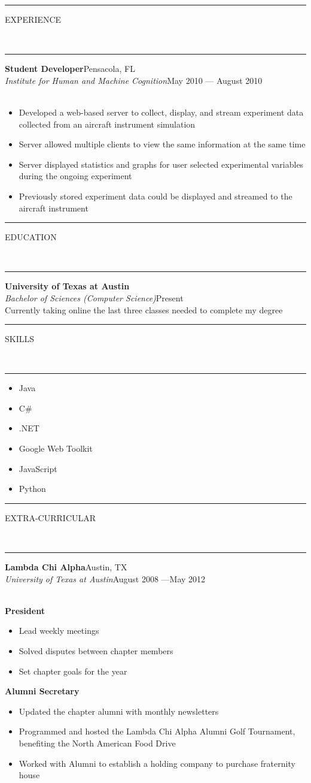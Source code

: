 \documentclass[10pt, letterpaper, oneside]{article}
\newcommand{\HRule}[2]{\textcolor{#1}{\rule{\linewidth}{#2}}}
\newcommand{\sectiontitle}[1]{\begin{minipage}{\textwidth}\HRule{black}{0.25mm}\vspace{-10pt}\begin{center}\Large\MakeUppercase{#1}\end{center}\end{minipage}\\\HRule{light-grey}{0.15mm}\vspace{\baselineskip}}
\newenvironment{ressection}[1]{
  \sectiontitle{#1}}
  {\vspace{-\baselineskip}}
\newenvironment{tightressection}[1]{
  \begin{minipage}{\textwidth}
  \sectiontitle{#1}}
  {\vspace{\baselineskip}\end{minipage}}
\newenvironment{rescolumn}{
  \begin{minipage}{0.5\textwidth}
    \begin{itemize}[noitemsep,nolistsep]}
  {\end{itemize}
    \end{minipage}}
\newcommand{\resitem}[1]{
    \vspace{2pt}
    \item \begin{flushleft} #1 \end{flushleft}
}
\newcommand{\resitemcenter}[1]{
    \vspace{2pt}
    \item \begin{center} #1 \end{center}
}
\newcommand{\resedentry}[4]{
  \begin{minipage}{\textwidth}
  \vspace{-10pt}
  \textbf{#1}\\
  \textit{#2}\hfill\textcolor{light-grey}{#3}\\
  #4
  \vspace{0.5\baselineskip}
  \end{minipage}
}
\newcommand{\resentryheader}[5]{
    \vspace{-5pt}
    \textbf{#1}\hspace{\stretch{1}}\textcolor{light-grey}{#3}\\
    \textit{#2}\hspace{\stretch{1}}\textcolor{light-grey}{#4}\\
    \if\relax\detokenize{#5}\relax
    \else
      #5\\
    \fi
    \vspace{2pt}
}
\newenvironment{resentry}[5]{
  \begin{minipage}{\textwidth}
    \resentryheader{#1}{#2}{#3}{#4}{#5}
        \vspace{-\baselineskip}
    \begin{itemize}[noitemsep,nolistsep]
}{
    \end{itemize}
        \vspace{\baselineskip}
        \end{minipage}
}
\newenvironment{ressubentry}[1]{
  \begin{minipage}{\textwidth}
    \resitem{\textbf{#1}}
    \begin{itemize}[noitemsep,nolistsep]
}{
    \end{itemize}
        \end{minipage}
}
\begin{document}
\begin{ressection}{experience}
  \begin{resentry}{Student Developer}{Institute for Human and Machine Cognition}{Pensacola, FL}{May 2010 --- August 2010}{}
    \resitem{Developed a web-based server to collect, display, and stream experiment data collected from an aircraft instrument simulation}
    \resitem{Server allowed multiple clients to view the same information at the same time}
    \resitem{Server displayed statistics and graphs for user selected experimental variables during the ongoing experiment}
    \resitem{Previously stored experiment data could be displayed and streamed to the aircraft instrument}
  \end{resentry}
 \vspace{5pt}
\end{ressection}
 


\begin{tightressection}{education}
  \resedentry{University of Texas at Austin}{Bachelor of Sciences (Computer Science)}{Present}{Currently taking online the last three classes needed to complete my degree}
  \vspace{-10pt}
\end{tightressection}

\begin{tightressection}{skills}
  \begin{rescolumn}
      \resitemcenter{Java}
      \resitemcenter{C\#}
      \resitemcenter{.NET}
    \end{rescolumn}
  \begin{rescolumn}
      \resitemcenter{Google Web Toolkit}
      \resitemcenter{JavaScript}
      \resitemcenter{Python}
    \end{rescolumn}
\end{tightressection}

\begin{tightressection}{Extra-Curricular}
 \begin{resentry}{Lambda Chi Alpha}{University of Texas at Austin}{Austin, TX}{August 2008 ---May 2012}{}
    \begin{ressubentry}{President}
      \resitem{Lead weekly meetings}
      \resitem{Solved disputes between chapter members}
      \resitem{Set chapter goals for the year}
    \end{ressubentry}
    \begin{ressubentry}{Alumni Secretary}
      \resitem{Updated the chapter alumni with monthly newsletters}
      \resitem{Programmed and hosted the Lambda Chi Alpha Alumni Golf Tournament, benefiting the North American Food Drive}
      \resitem{Worked with Alumni to establish a holding company to purchase fraternity house}
      \end{ressubentry}
  \end{resentry} 
  \vspace{-20pt}
\end{tightressection}
     
\end{document}
